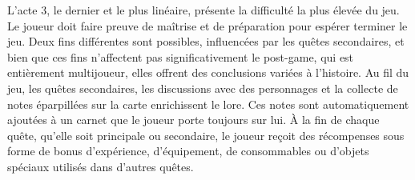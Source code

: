 L'acte 3, le dernier et le plus linéaire, présente la difficulté la plus élevée du jeu. Le joueur doit faire preuve de maîtrise et de préparation pour espérer terminer le jeu. Deux fins différentes sont possibles, influencées par les quêtes secondaires, et bien que ces fins n'affectent pas significativement le post-game, qui est entièrement multijoueur, elles offrent des conclusions variées à l'histoire.
Au fil du jeu, les quêtes secondaires, les discussions avec des personnages et la collecte de notes éparpillées sur la carte enrichissent le lore. Ces notes sont automatiquement ajoutées à un carnet que le joueur porte toujours sur lui. À la fin de chaque quête, qu'elle soit principale ou secondaire, le joueur reçoit des récompenses sous forme de bonus d'expérience, d'équipement, de consommables ou d'objets spéciaux utilisés dans d'autres quêtes.
